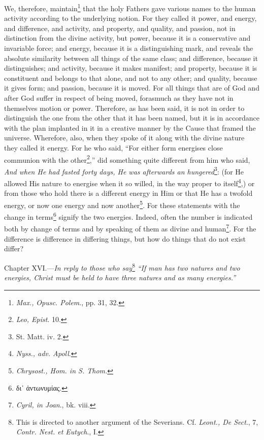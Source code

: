 We, therefore, maintain\footnote{\emph{Max.,} \emph{Opusc. Polem}., pp. 31, 32.} that the holy Fathers gave various names to the human activity according to the underlying notion. For they called it power, and energy, and difference, and activity, and property, and quality, and passion, not in distinction from the divine activity, but power, because it is a conservative and invariable force; and energy, because it is a distinguishing mark, and reveals the absolute similarity between all things of the same class; and difference, because it distinguishes; and activity, because it makes manifest; and property, because it is constituent and belongs to that alone, and not to any other; and quality, because it gives form; and passion, because it is moved. For all things that are of God and after God suffer in respect of being moved, forasmuch as they have not in themselves motion or power. Therefore, as has been said, it is not in order to distinguish the one from the other that it has been named, but it is in accordance with the plan implanted in it in a creative manner by the Cause that framed the universe. Wherefore, also, when they spoke of it along with the divine nature they called it energy. For he who said, “For either form energises close communion with the other\footnote{\emph{Leo, Epist}. 10.},” did something quite different from him who said, \emph{And when He had fasted forty days, He was afterwards an hungered}\footnote{St. Matt. iv. 2.}: (for He allowed His nature to energise when it so willed, in the way proper to itself\footnote{\emph{Nyss., adv. Apoll}.},) or from those who hold there is a different energy in Him or that He has a twofold energy, or now one energy and now another\footnote{\emph{Chrysost., Hom. in S. Thom.}}. For these statements with the change in terms\footnote{\textgreek{δι᾽ ἀντωνυμίας}.} signify the two energies. Indeed, often the number is indicated both by change of terms and by speaking of them as divine and human\footnote{\emph{Cyril, in Joan}., bk. viii.}. For the difference is difference in differing things, but how do things that do not exist differ?


Chapter XVI.—\emph{In reply to those who say}\footnote{This is directed to another argument of the Severians. Cf. \emph{Leont., De Sect}., 7, \emph{Contr. Nest. et Eutych}., I.} \emph{“If man has two natures and two energies, Christ must be held to have three natures and as many energies.”}

